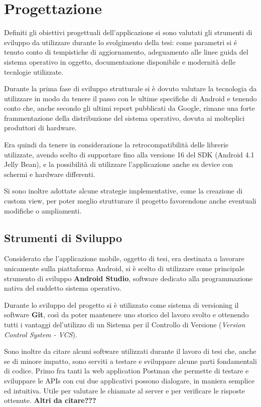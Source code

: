 \section{Progettazione}

Definiti gli obiettivi progettuali dell'applicazione si sono valutati gli strumenti di sviluppo da utilizzare durante lo svolgimento della tesi: come parametri si é tenuto conto di tempistiche di aggiornamento, adeguamento alle linee guida del sistema operativo in oggetto, documentazione disponibile e modernità delle tecnlogie utilizzate.

Durante la prima fase di sviluppo strutturale si è dovuto valutare la tecnologia da utilizzare in modo da tenere il passo con le ultime specifiche di Android e tenendo conto che, anche secondo gli ultimi report pubblicati da Google, rimane una forte frammentazione della distribuzione del sistema operativo, dovuta ai molteplici produttori di hardware. \autocite{ANDROIDSTUDIO:DASHBOARD}

Era quindi da tenere in considerazione la retrocompatibilità delle librerie utilizzate, avendo scelto di supportare fino alla versione 16 del SDK (Android 4.1 Jelly Bean), e la possibilità di utilizzare l'applicazione anche su device con schermi e hardware differenti.

Si sono inoltre adottate alcune strategie implementative, come la creazione di custom view, per poter meglio strutturare il progetto favorendone anche eventuali modifiche o ampliamenti.

\subsection{Strumenti di Sviluppo}
Considerato che l'applicazione mobile, oggetto di tesi, era destinata a lavorare unicamente sulla piattaforma Android, si è scelto di utilizzare come principale strumento di sviluppo \textbf{Android Studio}, software dedicato alla programmazione nativa del suddetto sistema operativo. \autocite{ANDROIDDEVELOPERS:FIRSTAPP}

Durante lo sviluppo del progetto si è utilizzato come sistema di versioning il software \textbf{Git}, così da poter mantenere uno storico del lavoro svolto e ottenendo tutti i vantaggi del'utilizzo di un Sistema per il Controllo di Versione (\textit{Version Control System - VCS}).

Sono inoltre da citare alcuni software utilizzati durante il lavoro di tesi che, anche se di minore impatto, sono serviti a testare e sviluppare alcune parti fondamentali di codice.
Primo fra tanti la web application Postman \autocite{POSTMAN} che permette di testare e sviluppare le APIs con cui due applicativi possono dialogare, in maniera semplice ed intuitiva. Utile per valutare le chiamate al server e per verificare le risposte ottenute.
\textbf{Altri da citare???}

